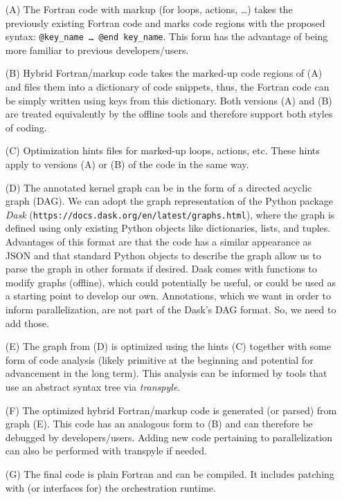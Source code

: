 \documentclass{article}
\begin{document}
\begin{enumerate}
  \item[(A)] The Fortran code with markup (for loops, actions, \ldots) takes the
    previously existing Fortran code and marks code regions with the proposed
    syntax: \texttt{@key\_name \ldots\ @end key\_name}.
    This form has the advantage of being more familiar to previous developers/users.
  \item[(B)] Hybrid Fortran/markup code takes the marked-up code regions of (A)
    and files them into a dictionary of code snippets, thus, the Fortran code
    can be simply written using keys from this dictionary.  Both versions (A)
    and (B) are treated equivalently by the offline tools and therefore support
    both styles of coding.
  \item[(C)] Optimization hints files for marked-up loops, actions, etc.
    These hints apply to versions (A) or (B) of the code in the same way.
  \item[(D)] The annotated kernel graph can be in the form of a directed acyclic
    graph (DAG).  We can adopt the graph representation of the Python package
    \emph{Dask} (\texttt{https://docs.dask.org/en/latest/graphs.html}), where the
    graph is defined using only existing Python objects like dictionaries,
    lists, and tuples.  Advantages of this format are that the code has a similar
    appearance as JSON and that standard Python objects to describe the
    graph allow us to parse the graph in other formats if desired.
    Dask comes with functions to modify graphs (offline), which could
    potentially be useful, or could be used as a starting point to develop our
    own.  Annotations, which we want in order to inform parallelization, are
    not part of the Dask's DAG format.  So, we need to add those.
  \item[(E)] The graph from (D) is optimized using the hints (C) together with
    some form of code analysis (likely primitive at the beginning and potential
    for advancement in the long term).  This analysis can be informed by tools
    that use an abstract syntax tree via \emph{transpyle}.
  \item[(F)] The optimized hybrid Fortran/markup code is generated (or parsed)
    from graph (E).  This code has an analogous form to (B) and can therefore
    be debugged by developers/users.  Adding new code pertaining to
    parallelization can also be performed with transpyle if needed.
  \item[(G)] The final code is plain Fortran and can be compiled.  It includes
    patching with (or interfaces for) the orchestration runtime.
\end{enumerate}
\end{document}
